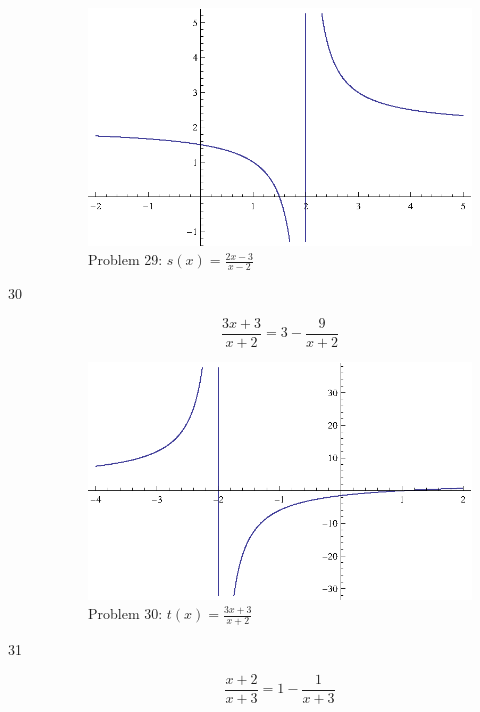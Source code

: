 \documentclass{exam}
\begin{document}
\begin{description}
      \begin{figure}[H]
        \centering
        \includegraphics[scale = 0.9]{problem29.eps}
        \caption*{Problem 29: $s(x) = \frac{2x-3}{x-2}$}
      \end{figure}

    \item[30] 
      \[ \frac{3x + 3}{x + 2} = 3 - \frac{9}{x + 2} \]

      \begin{figure}[H]
        \centering
        \includegraphics[scale = 0.9]{problem30.eps}
        \caption*{Problem 30: $t(x) = \frac{3x + 3}{x + 2}$}
      \end{figure}

    \item[31] 
      \[ \frac{x + 2}{x + 3} = 1 - \frac{1}{x + 3} \]


\end{description}
\end{document}

